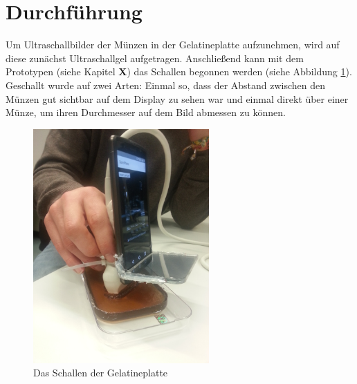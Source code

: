 \section{Durchführung}
Um Ultraschallbilder der Münzen in der Gelatineplatte aufzunehmen, wird auf diese zunächst Ultraschallgel aufgetragen. Anschließend kann mit dem Prototypen (siehe Kapitel \textbf{X}) das Schallen begonnen werden (siehe Abbildung \ref{fig:schallen}). Geschallt wurde auf zwei Arten: Einmal so, dass der Abstand zwischen den Münzen gut sichtbar auf dem Display zu sehen war und einmal direkt über einer Münze, um ihren Durchmesser auf dem Bild abmessen zu können.
\clearpage
\begin{figure}[h]
	\centering
	\includegraphics[width=0.6\textwidth]{Bilder/Evaluation/Schallen.jpg}
	\caption{Das Schallen der Gelatineplatte}
	\label{fig:schallen}
\end{figure}

